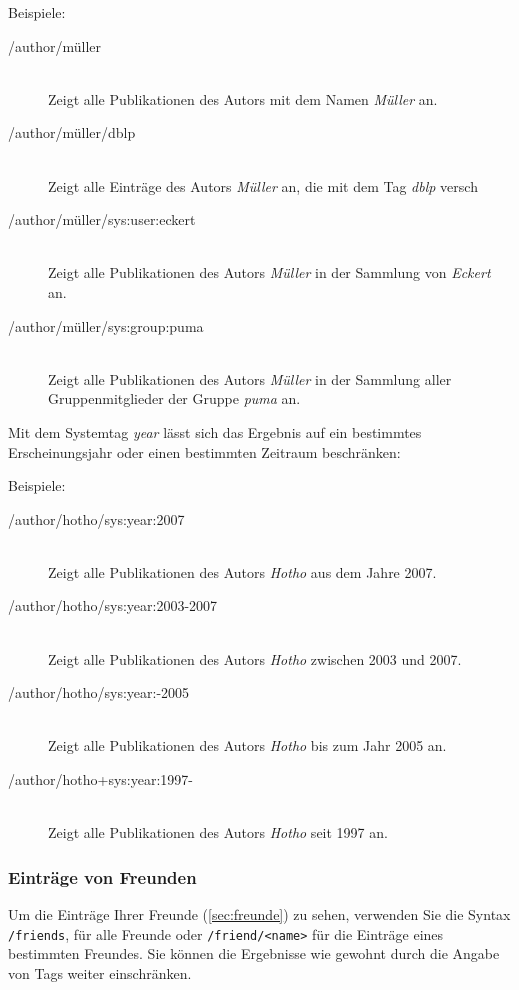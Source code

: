 Beispiele:
\begin{description}
    \item [/author/müller] \hfill \\
    Zeigt alle Publikationen des Autors mit dem Namen \textit{Müller} an.
    \item [/author/müller/dblp] \hfill \\
    Zeigt alle Einträge des Autors \textit{Müller} an, die mit dem Tag \textit{dblp} versch
    \item [/author/müller/sys:user:eckert] \hfill \\
    Zeigt alle Publikationen des Autors \textit{Müller} in der Sammlung von \textit{Eckert} an.
    \item [/author/müller/sys:group:puma] \hfill \\
    Zeigt alle Publikationen des Autors \textit{Müller} in der Sammlung aller Gruppenmitglieder der Gruppe \textit{puma} an. 
\end{description}

Mit dem Systemtag \textit{year} lässt sich das Ergebnis auf ein bestimmtes Erscheinungsjahr oder einen bestimmten Zeitraum beschränken:%

Beispiele:
\begin{description}
    \item [/author/hotho/sys:year:2007] \hfill \\
    Zeigt alle Publikationen des Autors \textit{Hotho} aus dem Jahre 2007.
    \item [/author/hotho/sys:year:2003-2007] \hfill \\
    Zeigt alle Publikationen des Autors \textit{Hotho} zwischen 2003 und 2007.
    \item [/author/hotho/sys:year:-2005] \hfill \\
    Zeigt alle Publikationen des Autors \textit{Hotho} bis zum Jahr 2005 an.
    \item [/author/hotho+sys:year:1997-] \hfill \\
    Zeigt alle Publikationen des Autors \textit{Hotho} seit 1997 an.
\end{description}

\subsubsection{Einträge von Freunden} 
\label{sss:vonFreunden}
Um die Einträge Ihrer Freunde (\autoref{sec:freunde}) zu sehen, verwenden Sie die Syntax \texttt{/friends}, für alle Freunde oder \texttt{/friend/<name>} für die Einträge eines bestimmten Freundes. Sie können die Ergebnisse wie gewohnt durch die Angabe von Tags weiter einschränken. 

